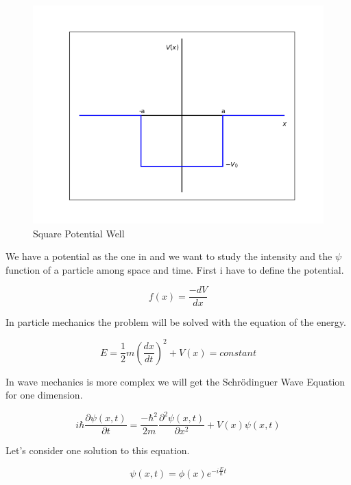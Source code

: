 \begin{figure}[H]
    \centering
    \includegraphics{images3/square_potential.png}
    \caption{Square Potential Well }
\end{figure}

We have a potential as the one in  and we want to study the intensity and the $\psi$ function of a particle among space and time. First i have to define the potential.


\begin{equation}
    f(x) = \frac{-dV}{dx}
\end{equation}

In particle mechanics the problem will be solved with the equation of the energy.

\begin{equation}
    \label{3.11}
    E = \frac{1}{2}m\left(\frac{dx}{dt}\right)^2 + V(x) = constant
\end{equation}

In wave mechanics is more complex we will get the Schrödinguer Wave Equation for one dimension.

\begin{equation}
    \label{3.12}
    i\hbar \frac{\partial\psi(x,t)}{\partial t} = \frac{-\hbar^2}{2m}\frac{\partial^2\psi(x,t)}{\partial x^2} + V(x)\psi(x,t)
\end{equation}

Let's consider one solution to this equation.

\begin{equation}
    \label{3.13}
    \psi(x,t) = \phi(x)e^{-i\frac{E}{\hbar}t}
\end{equation}

